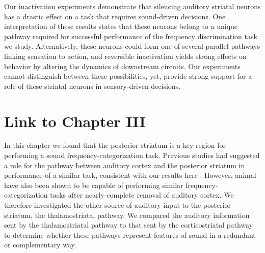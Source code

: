 Our inactivation experiments demonstrate that silencing auditory striatal neurons has a drastic effect on a task that requires sound-driven decisions.
%
One interpretation of these results states that these neurons belong to a unique pathway required for successful performance of the frequency discrimination task we study.
%
Alternatively, these neurons could form one of several parallel pathways linking sensation to action, and reversible inactivation yields strong effects on behavior by altering the dynamics of downstream circuits.
%
Our experiments cannot distinguish between these possibilities, yet, provide strong support for a role of these striatal neurons in sensory-driven decisions.

\section{Link to Chapter III}

In this chapter we found that the posterior striatum is a key region for performing a sound frequency-categorization task.
%
Previous studies had suggested a role for the pathway between auditory cortex and the posterior striatum in performance of a similar task, consistent with our results here \citep{Znamenskiy2013, Xiong2015}.
%
However, animal have also been shown to be capable of performing similar frequency-categorization tasks after nearly-complete removal of auditory cortex.
%
We therefore investigated the other source of auditory input to the posterior striatum, the thalamostriatal pathway. 
%
We compared the auditory information sent by the thalamostriatal pathway to that sent by the corticostriatal pathway to determine whether these pathways represent features of sound in a redundant or complementary way. 

